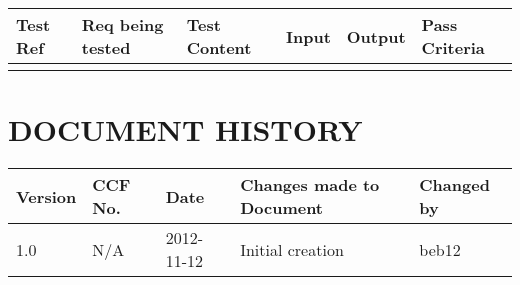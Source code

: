 \documentclass{project}
\begin{document}
\begin{tabular}{| p{2cm} | p{1cm} | p{2cm} | p{3cm} | p{3cm} | p{3cm} |}
\hline
Test Ref & Req being tested & Test Content & Input & Output & Pass Criteria \\
\hline
 &  &  &  &  &  \\
\hline
\end{tabular}


\clearpage
{}
\section*{DOCUMENT HISTORY}
\begin{tabular}{| l | l | l | l | l |}
\hline
Version & CCF No. & Date & Changes made to Document & Changed by \\
\hline
1.0 & N/A & 2012-11-12 & Initial creation & beb12 \\
\hline
\end{tabular}
\label{thelastpage}
\end{document}

